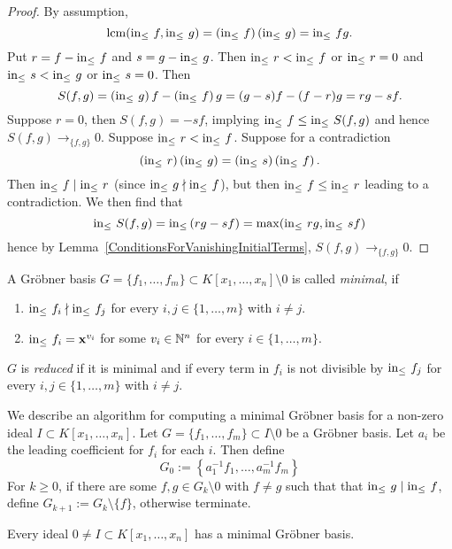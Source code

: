 \begin{proof}
    By assumption, 
    $$\mathrm{lcm}(\mathrm{in}_\leq\ f,\mathrm{in}_\leq\ g) = \left(\mathrm{in}_\leq\ f\right) \left(\mathrm{in}_\leq\ g\right) = \mathrm{in}_\leq\ fg.$$
    Put $r = f- \mathrm{in}_\leq\ f$ and $s = g -\mathrm{in}_\leq \ g$. Then $\mathrm{in}_\leq\ r < \mathrm{in}_\leq\ f$ or $\mathrm{in}_\leq\ r =0$ and $\mathrm{in}_\leq\ s < \mathrm{in}_\leq\ g$ or $\mathrm{in}_\leq\ s =0$. Then 
    $$S(f,g) = \left(\inn\ g\right)f -\left(\inn\ f\right)g = (g-s)f-(f-r)g=rg-sf.$$
    Suppose $r =0$, then $S(f,g)=-sf$, implying $\mathrm{in}_\leq\ f \leq \mathrm{in}_\leq\ S(f,g)$ and hence $S(f,g)\to_{\{f,g\}} 0$. Suppose $\mathrm{in}_\leq\ r < \mathrm{in}_\leq\ f$.  Suppose for a contradiction
    $$\left(\mathrm{in}_\leq\ r \right)\left(\mathrm{in}_\leq\ g \right) = \left(\mathrm{in}_\leq\ s \right)\left(\mathrm{in}_\leq\ f \right).$$
    Then $\inn\ f \mid \inn\ r$ (since $\inn\ g \nmid \inn\ f$), but then $\inn\ f \leq \inn\ r$ leading to a contradiction. We then find that 
    $$\mathrm{in}_\leq\ S(f,g) = \mathrm{in}_\leq\left( rg - sf\right) = \max(\mathrm{in}_\leq\ rg, \mathrm{in}_\leq\ sf)$$
    hence by Lemma~\ref{ConditionsForVanishingInitialTerms}, $S(f,g)\to_{\{f,g\}} 0.$
\end{proof}
\begin{definition}
    A Gröbner basis $G=\{f_1,\dots,f_m\}\subset K[x_1,\dots,x_n]\setminus 0$ is called \textit{minimal}, if
    \begin{enumerate}
        \item $\mathrm{in}_\leq\ f_i\nmid \mathrm{in}_\leq\ f_j$ for every $i,j\in\{1,\dots,m\}$ with $i\neq j$.
        \item $\mathrm{in}_\leq\ f_i = \mathbf{x}^{v_i}$ for some $v_i\in \mathbb{N}^n$ for every $i\in\{1,\dots,m\}$.
    \end{enumerate}
    $G$ is \textit{reduced} if it is minimal and if every term in $f_i$ is not divisible by $\mathrm{in}_\leq\ f_j$ for every $i,j\in\{1,\dots,m\}$ with $i\neq j$.  
\end{definition}
\begin{remark}
    We describe an algorithm for computing a minimal Gröbner basis for a non-zero ideal $I\subset K[x_1,\dots,x_n]$. Let $G=\{f_1,\dots,f_m\}\subset I\setminus 0$ be a Gröbner basis. Let $a_i$ be the leading coefficient for $f_i$ for each $i$. Then define 
    $$G_0 := \left\{a_1^{-1}f_1,\dots,a_m^{-1}f_m\right\}$$
    For $k\geq 0$, if there are some $f,g\in G_k\setminus 0$ with $f\neq g$ such that that $\mathrm{in}_\leq\ g \mid \mathrm{in}_\leq\ f$, define $G_{k+1}:=G_k\setminus \{f\}$, otherwise terminate.
\end{remark}
\begin{lemma}
    Every ideal $0\neq I\subset K[x_1,\dots,x_n]$ has a minimal Gröbner basis. 
\end{lemma}
